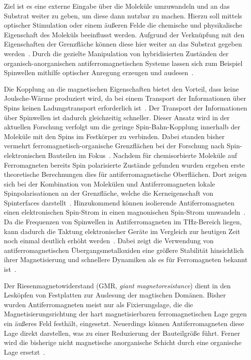    Ziel ist es eine externe Eingabe über die Moleküle umzuwandeln und an das Substrat weiter zu geben, um diese dann nutzbar zu machen.
    Hierzu soll mittels optischer Stimulation oder einem äußeren Felde die chemische und physikalische Eigenschaft des Moleküls beeinflusst werden.
    Aufgrund der Verknüpfung mit den Eigenschaften der Grenzfläche können diese hier weiter an das Substrat gegeben werden~\cite{IF_16}.
    Durch die gezielte Manipulation von hybridisierten Zuständen der organisch-anorganischen antiferromagnetischen Systeme lassen sich zum Beispiel Spinwellen mithilfe optischer Anregung erzeugen und auslesen~\cite{SINFONIA}.

    Die Kopplung an die magnetischen Eigenschaften bietet den Vorteil, dass keine Joulsche-Wärme produziert wird, da bei einem Transport der Informationen über Spins keinen Ladungstransport erforderlich ist~\cite{AFM_3}.
    Der Transport der Informationen über Spinwellen ist dadurch gleichzeitig schneller.
    Dieser Ansatz wird in der aktuellen Forschung verfolgt um die geringe Spin-Bahn-Kopplung innerhalb der Moleküle mit den Spins im Festkörper zu verbinden.
    Dabei standen bisher vermehrt ferromagnetisch-organische Grenzflächen bei der Forschung nach Spin-elektronischen Bauteilen im Fokus~\cite{ma-DJ, AFM_5}.
    Nachdem für chemisorbierte Moleküle auf Ferromagneten bereits Spin polarisierte Zustände gefunden wurden \cite{IF_16} ergeben erste theoretische Berechnungen dies für antiferromagnetische Oberflächen.
    Dort zeigen sich bei der Kombination von Molekülen und Antiferromagneten lokale Spinpolarisationen an der Grenzfläche, welche die Kerneigenschaft von Spinterfaces darstellt~\cite{AFM_2}.
    Hinzukommend können isolierende Antiferromagneten einen elektronischen Spin-Strom in einen magnonischen Spin-Strom umwandeln~\cite{AFM_1}.
    Da die Frequenzen von Spinwellen in Antiferromagneten im \si{\tera\hertz}-Bereich liegen, kann dadurch die Taktung elektronischer Geräte im Vergleich zur heutigen Zeit noch einmal deutlich erhöht werden~\cite{AFM_5}.
    Dabei zeigt die Verwendung von antiferromagnetischen Übergangsmetalloxiden eine größere Stabilität hinsichtlich ihrer Magnetisierung und schnellere Dynamiken als es für Ferromagneten bekannt ist~\cite{AFM_1}.
    
    Der Riesenmagnetowiderstand (GMR, \textit{giant magnetoresistance}) dient in den Lesköpfen von Festplatten zur Auslesung der magtischen Domänen.
    Bisher wurden Antiferromagneten meist nur als Fixierungslage, die die Magnetisierungsrichtung der hart magnetisierbaren ferromagnetischen Lage gegen ein äußeres Feld festhält, eingesetzt.
    Neuerdings können Antiferromagneten diese Lage direkt darstellen, was zu einer Reduzierung der Bauteilgröße führt.
    Ferner wird die bisherige nicht magnetische anorganische Schicht durch eine organische Lage ersetzt~\cite{bagrets_single_2012}.

